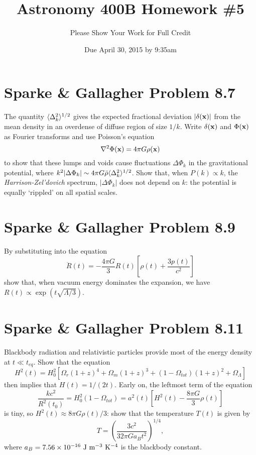 \documentclass[]{article}
\title{Astronomy 400B Homework \#5}
\author{Please Show Your Work for Full Credit}
\date{Due April 30, 2015 by 9:35am}
\begin{document}
\maketitle

\section{Sparke \& Gallagher Problem 8.7}

The quantity $\langle\Delta_k^2\rangle^{1/2}$ gives the expected fractional deviation
$|\delta(\mathbf{x})|$ from the mean density in an overdense of diffuse region of
size $1/k$.  Write $\delta(\mathbf{x})$ and $\Phi(\mathbf{x})$ as Fourier transforms and
use Poisson's equation
\begin{equation}
\nabla^2 \Phi(\mathbf{x}) = 4\pi G \rho(\mathbf{x})
\end{equation}
\noindent
to show that these lumps and voids cause fluctuations $\Delta\Phi_k$ in the
gravitational potential, where $k^2|\Delta\Phi_k|\sim4\pi G\bar{\rho}\langle\Delta_k^2\rangle^{1/2}$.
Show that, when $P(k)\propto k$, the {\it Harrison-Zel'dovich} spectrum, $|\Delta\Phi_k|$ does
not depend on $k$: the potential is equally `rippled' on all spatial scales.

\section{Sparke \& Gallagher Problem 8.9}

By substituting into the equation
\begin{equation}
\ddot{R}(t) = -\frac{4\pi G}{3} R(t)\left[ \rho(t) + \frac{3p(t)}{c^2}\right]
\end{equation}
\noindent
show that, when vacuum energy dominates the expansion, we have $R(t) \propto \exp(t\sqrt{\Lambda/3})$.

\section{Sparke \& Gallagher Problem 8.11}

Blackbody radiation and relativistic particles provide most of the
energy density at $t\ll t_{eq}$. Show that the equation
\begin{equation}
H^2(t) = H_0^2[\Omega_r(1+z)^4 + \Omega_m(1+z)^3 + (1 -\Omega_{tot})(1+z)^2 + \Omega_{\Lambda}]
\end{equation}
\noindent
then implies that $H(t)=1/(2t)$. Early on, the leftmost term of the
equation
\begin{equation}
\frac{kc^2}{R^2(t_0)} = H_0^2(1-\Omega_{tot}) = a^2(t)\left[H^2(t) - \frac{8\pi G}{3} \rho(t)\right]
\end{equation}
\noindent
is tiny, so $H^2(t)\approx8\pi G\rho(t)/3$: show that the temperature $T(t)$ is
given by
\begin{equation}
T = \left(\frac{3c^2}{32 \pi G a_B t^2}\right)^{1/4},
\end{equation}
where $a_B = 7.56\times 10^{-16}~\mathrm{J}~\mathrm{m}^{-3}~\mathrm{K}^{-4}$ is the blackbody constant.
\end{document}
